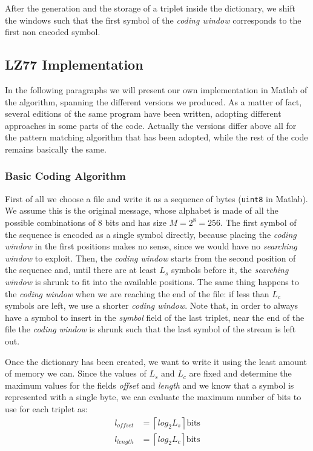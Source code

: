 After the generation and the storage of a triplet inside the dictionary, we shift the windows such that the first symbol of the \textit{coding window} corresponds to the first non encoded symbol.

\subsection{LZ77 Implementation} \label{subsec:lz77implem}
In the following paragraphs we will present our own implementation in Matlab of the algorithm, spanning the different versions we produced. As a matter of fact, several editions of the same program have been written, adopting different approaches in some parts of the code. Actually the versions differ above all for the pattern matching algorithm that has been adopted, while the rest of the code remains basically the same.

\subsubsection{Basic Coding Algorithm} \label{subsubsec:basiclz77}
First of all we choose a file and write it as a sequence of bytes (\texttt{uint8} in Matlab). We assume this is the original message, whose alphabet is made of all the possible combinations of $8$ bits and has size $M = 2^8 = 256$. The first symbol of the sequence is encoded as a single symbol directly, because placing the \textit{coding window} in the first positions makes no sense, since we would have no \textit{searching window} to exploit. Then, the \textit{coding window} starts from the second position of the sequence and, until there are at least $L_s$ symbols before it, the \textit{searching window} is shrunk to fit into the available positions. The same thing happens to the \textit{coding window} when we are reaching the end of the file: if less than $L_c$ symbols are left, we use a shorter \textit{coding window}. Note that, in order to always have a symbol to insert in the \textit{symbol} field of the last triplet, near the end of the file the \textit{coding window} is shrunk such that the last symbol of the stream is left out.

Once the dictionary has been created, we want to write it using the least amount of memory we can. Since the values of $L_s$ and $L_c$ are fixed and determine the maximum values for the fields \textit{offset} and \textit{length} and we know that a symbol is represented with a single byte, we can evaluate the maximum number of bits to use for each triplet as:
\begin{align}
l_{offset} &= \left \lceil log_2L_s \right \rceil \text{bits} \\
l_{length} &= \left \lceil log_2L_c \right \rceil \text{bits} 
\end{align}

